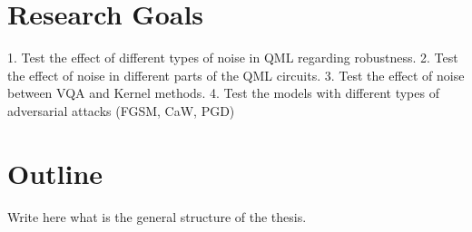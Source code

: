 \section{Research Goals}
1. Test the effect of different types of noise in QML regarding robustness.
2. Test the effect of noise in different parts of the QML circuits.
3. Test the effect of noise between VQA and Kernel methods.
4. Test the models with different types of adversarial attacks (FGSM, CaW, PGD)

\section{Outline}
Write here what is the general structure of the thesis.